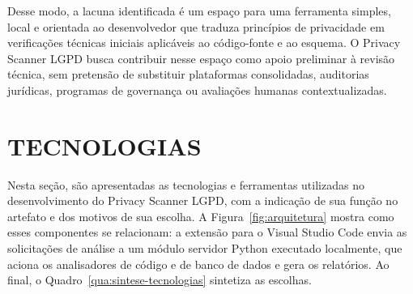 \documentclass[12pt,a4paper,oneside]{report}
\begin{document}
Desse modo, a lacuna identificada é um espaço para uma ferramenta simples, local e orientada ao desenvolvedor que traduza princípios de privacidade em verificações técnicas iniciais aplicáveis ao código-fonte e ao esquema. O Privacy Scanner LGPD busca contribuir nesse espaço como apoio preliminar à revisão técnica, sem pretensão de substituir plataformas consolidadas, auditorias jurídicas, programas de governança ou avaliações humanas contextualizadas.

\chapter{TECNOLOGIAS}

Nesta seção, são apresentadas as tecnologias e ferramentas utilizadas no desenvolvimento do Privacy Scanner LGPD, com a indicação de sua função no artefato e dos motivos de sua escolha. A Figura~\ref{fig:arquitetura} mostra como esses componentes se relacionam: a extensão para o Visual Studio Code envia as solicitações de análise a um módulo servidor Python executado localmente, que aciona os analisadores de código e de banco de dados e gera os relatórios. Ao final, o Quadro~\ref{qua:sintese-tecnologias} sintetiza as escolhas.
\end{document}
